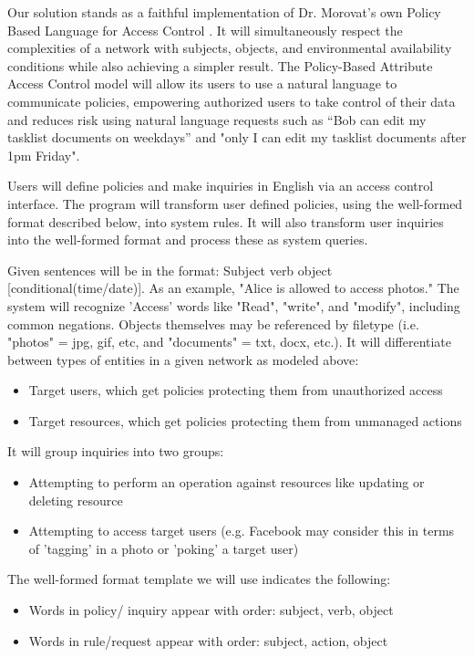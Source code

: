 \documentclass[12pt]{article}
\begin{document}
Our solution stands as a faithful implementation of Dr. Morovat's own Policy Based Language for Access Control \cite{morovat16}. It will simultaneously respect the complexities of a network with subjects, objects, and environmental availability conditions while also achieving a simpler result. The Policy-Based Attribute Access Control model will allow its users to use a natural language to communicate policies, empowering authorized users to take control of their data and reduces risk using natural language requests such as “Bob can edit my tasklist documents on weekdays” and "only I can edit my tasklist documents after 1pm Friday".

Users will define policies and make inquiries in English via an access control interface. The program will transform user defined policies, using the well-formed format described below, into system rules. It will also transform user inquiries into the well-formed format and process these as system queries.

Given sentences will be in the format: Subject verb object [conditional(time/date)]. As an example, "Alice is allowed to access photos."
The system will recognize 'Access' words like "Read", "write", and "modify", including common negations. Objects themselves may be referenced by filetype (i.e. "photos" = jpg, gif, etc, and "documents" = txt, docx, etc.). It will differentiate between types of entities in a given network as modeled above:
\begin{itemize}
    \item Target users, which get policies protecting them from unauthorized access
    \item Target resources, which get policies protecting them from unmanaged actions
\end{itemize}
It will group inquiries into two groups:
\begin{itemize}
    \item Attempting to perform an operation against resources like updating or deleting resource
    \item Attempting to access target users (e.g. Facebook may consider this in terms of 'tagging' in a photo or 'poking' a target user)
\end{itemize}
The well-formed format template we will use indicates the following:
\begin{itemize}
    \item Words in policy/ inquiry appear with order: subject, verb, object
    \item Words in rule/request appear with order: subject, action, object
\end{itemize}
\end{document}
